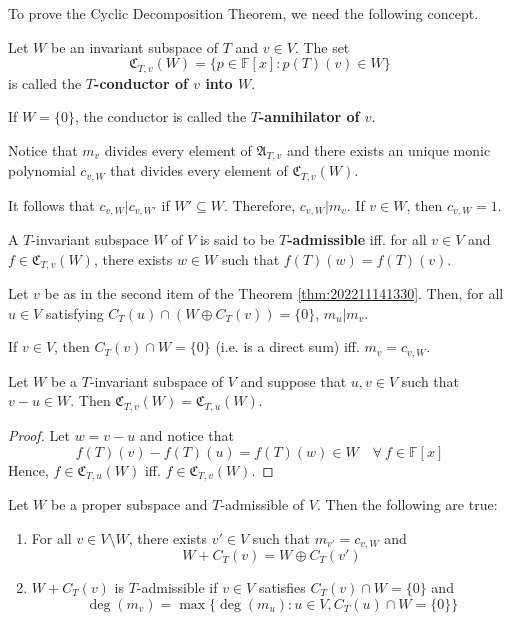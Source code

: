 To prove the Cyclic Decomposition Theorem, we need the following concept.

\begin{definition}[Conductor]
	Let $W$ be an invariant subspace of $T$ and $v \in V$. The set
	\[
    \mathfrak{C}_{T,v}(W) = \{ p \in \mathbb{F}[x] : p(T)(v) \in W \}
	\]
	is called the \textbf{$T$-conductor of $v$ into $W$}.

	If $W = \{ 0 \}$, the conductor is called the \textbf{$T$-annihilator of $v$}.
\end{definition}

Notice that $m_v$ divides every element of $\mathfrak{A}_{T,v}$ and there exists an unique monic polynomial $c_{v,W}$ that divides every element of $\mathfrak{C}_{T,v}(W)$.

It follows that $c_{v,W} | c_{v,W'}$ if $W' \subseteq W$. Therefore, $c_{v,W} | m_v$. If $v \in W$, then $c_{v,W} = 1$.

\begin{definition}
  A $T$-invariant subspace $W$ of $V$ is said to be \textbf{$T$-admissible} iff. for all $v \in V$ and $f \in \mathfrak{C}_{T,v}(W)$, there exists $w \in W$ such that $f(T)(w) = f(T)(v)$.
\end{definition}

\begin{lemma}\label{lm:202211141448}
  Let $v$ be as in the second item of the Theorem \ref{thm:202211141330}. Then, for all $u \in V$ satisfying $C_T(u) \cap (W \oplus C_T(v)) = \{0 \}$, $m_u | m_v$.
\end{lemma}

\begin{lemma}\label{lm:202211141449}
  If $v \in V$, then $C_T(v) \cap W = \{ 0 \}$ (i.e. is a direct sum) iff. $m_v = c_{v,W}$.
\end{lemma}

\begin{lemma}\label{lm:202211141450}
  Let $W$ be a $T$-invariant subspace of $V$ and suppose that $u, v \in V$ such that $v-u \in W$. Then $\mathfrak{C}_{T,v}(W) = \mathfrak{C}_{T,u}(W)$.
\end{lemma}

\begin{proof}
  Let $w = v-u$ and notice that 
  \[
    f(T)(v) - f(T)(u) = f(T)(w) \in W \quad \forall~f \in \mathbb{F}[x]
  \]
  Hence, $f \in \mathfrak{C}_{T,u}(W)$ iff. $f \in \mathfrak{C}_{T,v}(W)$.
\end{proof}

\begin{theorem}\label{thm:202211141330}
  Let $W$ be a proper subspace and $T$-admissible of $V$. Then the following are true:
  \begin{enumerate}
    \item For all $v \in V \setminus W$, there exists $v' \in V$ such that $m_{v'} = c_{v,W}$ and \[ W + C_T(v) = W \oplus C_T(v') \] 
    \item $W + C_T(v)$ is $T$-admissible if $v \in V$ satisfies $C_T(v) \cap W = \{ 0 \}$ and \[ \deg(m_v) = \max \{ \deg(m_u) : u \in V, C_T(u) \cap W = \{ 0 \} \} \]
  \end{enumerate}
\end{theorem}

